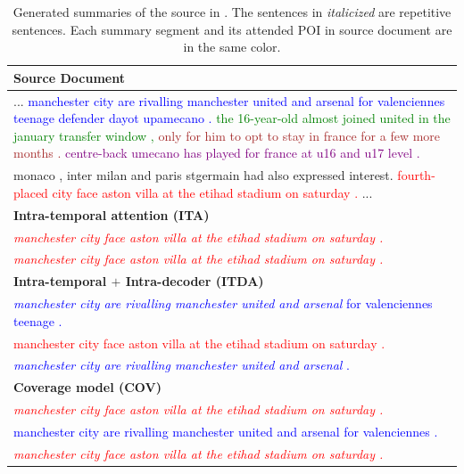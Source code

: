 \begin{table}[th!]
\begin{center}
\caption{\label{tab:strong_methods} Generated summaries of the source in . The sentences in \textit{italicized} are repetitive sentences.
Each summary segment and its attended POI in source document are in the same color.}
\begin{tabular}{p{13cm}}
\toprule[1pt] \bf Source Document \\
\hline ... \textcolor{blue}{manchester city are rivalling manchester united and arsenal for valenciennes teenage defender dayot upamecano .} \textcolor{green}{the 16-year-old almost joined united in the january transfer window ,} \textcolor{brown}{only for him to opt to stay in france for a few more months .}  \textcolor{purple}{centre-back umecano has played for france at u16 and u17 level .} \\
monaco , inter milan and paris stgermain had also expressed interest. \textcolor{red}{fourth-placed city face aston villa at the etihad stadium on saturday .} ...\\
\cmidrule[1pt]{1-1} \bf Intra-temporal attention (ITA) \\
\hline \textcolor{red}{\textit{manchester city face aston villa at the etihad stadium on saturday .}} \\
          \textcolor{red}{\textit{manchester city face aston villa at the etihad stadium on saturday .}} \\
\cmidrule[1pt]{1-1} \bf Intra-temporal $+$ Intra-decoder (ITDA) \\
\hline \textcolor{blue}{\textit{manchester city are rivalling manchester united and arsenal }for valenciennes teenage .}\\
        \textcolor{red}{manchester city face aston villa at the etihad stadium on saturday .} \\
	   \textcolor{blue}{\textit{manchester city are rivalling manchester united and arsenal }. }\\
\cmidrule[1pt]{1-1} \bf Coverage model (COV) \\
\hline \textcolor{red}{\textit{manchester city face aston villa at the etihad stadium on saturday .}} \\
       \textcolor{blue}{manchester city are rivalling manchester united and arsenal for valenciennes .}\\
      \textcolor{red}{\textit{manchester city face aston villa at the etihad stadium on saturday .}} \\

\end{tabular}
\end{center}
\end{table}
